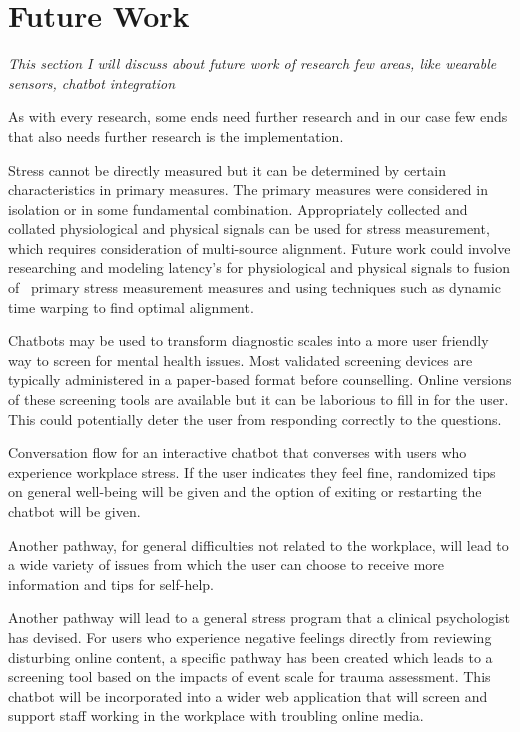 \chapter{Future Work}
\textit{This section I will discuss about future work of research few areas, like wearable sensors, chatbot integration}
\vspace{5mm}

As with every research, some ends need further research and in our case few ends that also
needs further research is the implementation.

Stress cannot be directly measured but it can be determined by certain characteristics in primary measures. The primary measures were considered in isolation or in some fundamental combination. Appropriately collected and collated physiological and physical signals can be used for stress measurement, which requires consideration of multi-source alignment. Future work could involve researching and modeling latency's for physiological and physical signals to fusion of  primary stress measurement measures and using techniques such as dynamic time warping to find optimal alignment.

Chatbots may be used to transform diagnostic scales into a more user friendly way to screen for mental health issues. Most validated screening devices are typically administered in a paper-based format before counselling. Online versions of these screening tools are available but it can be laborious to fill in for the user. This could potentially deter the user from responding correctly to the questions.

Conversation flow for an interactive chatbot that converses with users who experience workplace stress. If the user indicates they feel fine, randomized tips on general well-being will be given and the option of exiting or restarting the chatbot will be given. 

Another pathway, for general difficulties not related to the workplace, will lead to a wide variety of issues from which the user can choose to receive more information and tips for self-help.

Another pathway will lead to a general stress program that a clinical psychologist has devised. For users who experience negative feelings directly from reviewing disturbing online content, a specific pathway has been created which leads to a screening tool based on the impacts of event scale for trauma assessment. This chatbot will be incorporated into a wider web application that will screen and support staff working in the workplace with troubling online media.